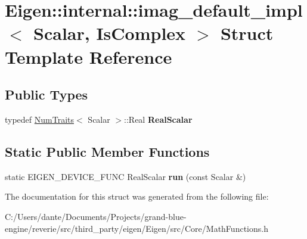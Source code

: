 \hypertarget{struct_eigen_1_1internal_1_1imag__default__impl}{}\section{Eigen\+::internal\+::imag\+\_\+default\+\_\+impl$<$ Scalar, Is\+Complex $>$ Struct Template Reference}
\label{struct_eigen_1_1internal_1_1imag__default__impl}
\subsection*{Public Types}
\begin{DoxyCompactItemize}
\item 
\mbox{\label{struct_eigen_1_1internal_1_1imag__default__impl_a78ba65e8b609cfa518166f018de0f3b0}} 
typedef \mbox{\hyperlink{struct_eigen_1_1_num_traits}{Num\+Traits}}$<$ Scalar $>$\+::Real {\bfseries Real\+Scalar}
\end{DoxyCompactItemize}
\subsection*{Static Public Member Functions}
\begin{DoxyCompactItemize}
\item 
\mbox{\label{struct_eigen_1_1internal_1_1imag__default__impl_a633aa19ff7b546b6cbf6fa4bc16c6b31}} 
static E\+I\+G\+E\+N\+\_\+\+D\+E\+V\+I\+C\+E\+\_\+\+F\+U\+NC Real\+Scalar {\bfseries run} (const Scalar \&)
\end{DoxyCompactItemize}


The documentation for this struct was generated from the following file\+:\begin{DoxyCompactItemize}
\item 
C\+:/\+Users/dante/\+Documents/\+Projects/grand-\/blue-\/engine/reverie/src/third\+\_\+party/eigen/\+Eigen/src/\+Core/Math\+Functions.\+h\end{DoxyCompactItemize}
